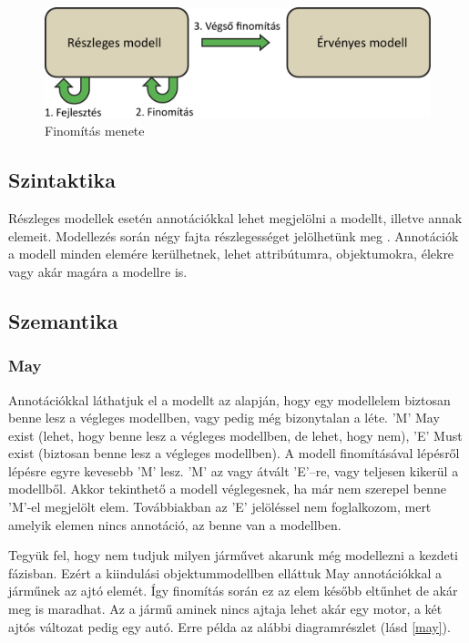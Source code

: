\begin{figure}[!ht]
	\centering
	\includegraphics[width=130mm]{figures/finom.pdf}
	\caption{Finomítás menete} 
	\label{finomit}
\end{figure}

\subsection{Szintaktika}
Részleges modellek esetén annotációkkal lehet megjelölni a modellt, illetve annak elemeit. Modellezés során négy fajta részlegességet jelölhetünk meg \cite{Salay}. Annotációk a modell minden elemére kerülhetnek, lehet attribútumra, objektumokra, élekre vagy akár magára a modellre is.


\subsection{Szemantika}
\subsubsection{May}
Annotációkkal láthatjuk el a modellt az alapján, hogy egy modellelem biztosan benne lesz a végleges modellben, vagy pedig még bizonytalan a léte. \textsf{’M’} May exist (lehet, hogy benne lesz a végleges modellben, de lehet, hogy nem), \textsf{’E’} Must exist (biztosan benne lesz a végleges modellben). A modell finomításával lépésről lépésre egyre kevesebb ’M’ lesz.  \textsf{’M’} az vagy átvált \textsf{’E’}–re, vagy teljesen kikerül a modellből. Akkor tekinthető a modell véglegesnek, ha már nem szerepel benne \textsf{’M’}-el megjelölt elem. Továbbiakban az \textsf{’E’} jelöléssel nem foglalkozom, mert amelyik elemen nincs annotáció, az benne van a modellben.
\par
Tegyük fel, hogy nem tudjuk milyen járművet akarunk még modellezni a kezdeti fázisban. Ezért a kiindulási objektummodellben elláttuk May annotációkkal a járműnek az ajtó elemét. Így finomítás során ez az elem később eltűnhet de akár meg is maradhat. Az a jármű aminek nincs ajtaja lehet akár egy motor, a két ajtós változat pedig egy autó. Erre példa az alábbi diagramrészlet (lásd \autoref{may}).

